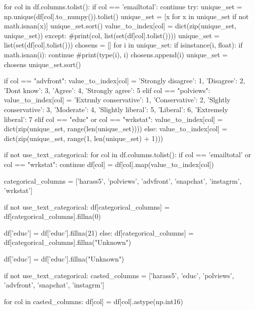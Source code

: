 \begin{python}
    for col in df.columns.tolist():
        if col == 'emailtotal':
            continue
        try:
            unique_set = np.unique(df[col].to_numpy()).tolist()
            unique_set = [x for x in unique_set if not math.isnan(x)]
            unique_set.sort()
            value_to_index[col] = dict(zip(unique_set, unique_set))
        except:
            #print(col, list(set(df[col].tolist())))
            unique_set = list(set(df[col].tolist()))
            chosens = []
            for i in unique_set:
                if isinstance(i, float):
                    if math.isnan(i):
                        continue
                #print(type(i), i)
                chosens.append(i)
            unique_set = chosens
            unique_set.sort()

            if col == "advfront":
                value_to_index[col] = {'Strongly disagree': 1, 'Disagree': 2, 'Dont know': 3, 'Agree': 4, 'Strongly agree': 5}
            elif col == "polviews":
                value_to_index[col] = {'Extrmly conservative': 1, 'Conservative': 2, 'Slghtly conservative': 3, 'Moderate': 4, 'Slightly liberal': 5, 'Liberal': 6, 'Extremely liberal': 7}
            elif col == "educ" or col == "wrkstat":
                value_to_index[col] = dict(zip(unique_set, range(len(unique_set))))
            else:
                value_to_index[col] = dict(zip(unique_set, range(1, len(unique_set) + 1)))
                
    if not use_text_categorical:
        for col in df.columns.tolist():
            if col == 'emailtotal' or col == "wrkstat":
                continue
            df[col] = df[col].map(value_to_index[col])
            
    categorical_columns = ['harass5', 'polviews', 'advfront', 'snapchat', 'instagrm', 'wrkstat']
    
    if not use_text_categorical:
        df[categorical_columns] = df[categorical_columns].fillna(0)

        df['educ'] = df['educ'].fillna(21)
    else:
        df[categorical_columns] = df[categorical_columns].fillna("Unknown")

        df['educ'] = df['educ'].fillna("Unknown")
    

    if not use_text_categorical:
        casted_columns = ['harass5', 'educ', 'polviews', 'advfront', 'snapchat', 'instagrm']
    
        for col in casted_columns:
            df[col] = df[col].astype(np.int16)
            

\end{python}
